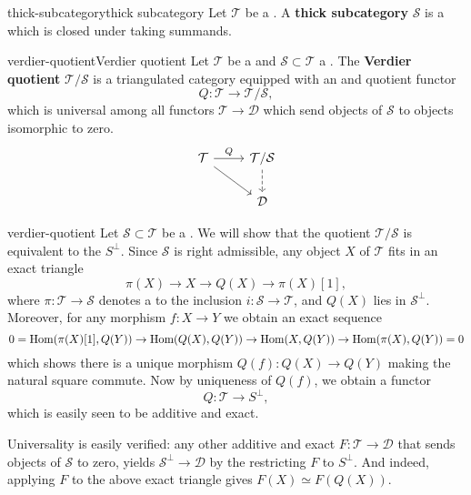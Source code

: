 \begin{topic}{thick-subcategory}{thick subcategory}
    Let $\mathcal{T}$ be a . A \textbf{thick subcategory} $\mathcal{S}$ is a   which is closed under taking summands.
\end{topic}

\begin{topic}{verdier-quotient}{Verdier quotient}
    Let $\mathcal{T}$ be a  and $\mathcal{S} \subset \mathcal{T}$ a . The \textbf{Verdier quotient} $\mathcal{T}/\mathcal{S}$ is a triangulated category equipped with an  and  quotient functor
    \[ Q : \mathcal{T} \to \mathcal{T}/\mathcal{S} , \]
    which is universal among all functors $\mathcal{T} \to \mathcal{D}$ which send objects of $\mathcal{S}$ to objects isomorphic to zero.
    \[ \begin{tikzcd} \mathcal{T} \arrow{r}{Q} \arrow{rd} & \mathcal{T} / \mathcal{S} \arrow[dashed]{d} \\ & \mathcal{D} \end{tikzcd} \]
\end{topic}

\begin{example}{verdier-quotient}
    Let $\mathcal{S} \subset \mathcal{T}$ be a . We will show that the quotient $\mathcal{T}/\mathcal{S}$ is equivalent to the  $S^\perp$. Since $\mathcal{S}$ is right admissible, any object $X$ of $\mathcal{T}$ fits in an exact triangle
    \[ \pi(X) \to X \to Q(X) \to \pi(X)[1] , \]
    where $\pi : \mathcal{T} \to \mathcal{S}$ denotes a  to the inclusion $i : \mathcal{S} \to \mathcal{T}$, and $Q(X)$ lies in $\mathcal{S}^\perp$. Moreover, for any morphism $f : X \to Y$ we obtain an exact sequence
    \[ 0 = \text{Hom}(\pi(X)[1], Q(Y)) \to \text{Hom}(Q(X), Q(Y)) \to \text{Hom}(X, Q(Y)) \to \text{Hom}(\pi(X), Q(Y)) = 0 \]
    which shows there is a unique morphism $Q(f) : Q(X) \to Q(Y)$ making the natural square commute.
    Now by uniqueness of $Q(f)$, we obtain a functor
    \[ Q : \mathcal{T} \to S^\perp , \]
    which is easily seen to be additive and exact.
    
    Universality is easily verified: any other additive and exact $F : \mathcal{T} \to \mathcal{D}$ that sends objects of $\mathcal{S}$ to zero, yields $\mathcal{S}^\perp \to \mathcal{D}$ by the restricting $F$ to $S^\perp$. And indeed, applying $F$ to the above exact triangle gives $F(X) \simeq F(Q(X))$.
\end{example}

